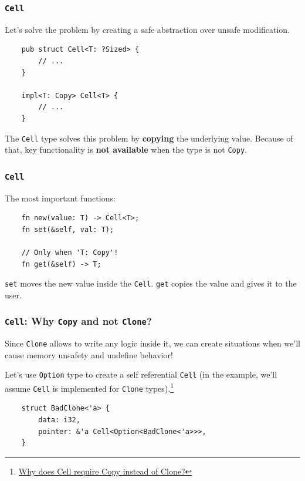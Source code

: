 \documentclass[aspectratio=1610,t]{beamer}
\begin{document}

\begin{frame}[fragile]
\frametitle{\texttt{Cell}}
Let's solve the problem by creating a safe abstraction over unsafe modification.

\begin{verbatim}
    pub struct Cell<T: ?Sized> {
        // ...
    }

    impl<T: Copy> Cell<T> {
        // ...
    }
\end{verbatim}

The \texttt{Cell} type solves this problem by \textbf{copying} the underlying value. Because of that, key functionality is \textbf{not available} when the type is not \texttt{Copy}.
\end{frame}


\begin{frame}[fragile]
\frametitle{\texttt{Cell}}
The most important functions:

\begin{verbatim}
    fn new(value: T) -> Cell<T>;
    fn set(&self, val: T);

    // Only when 'T: Copy'!
    fn get(&self) -> T;
\end{verbatim}

\texttt{set} moves the new value inside the \texttt{Cell}. \texttt{get} copies the value and gives it to the user.
\end{frame}


\begin{frame}[fragile]
\frametitle{\texttt{Cell}: Why \texttt{Copy} and not \texttt{Clone}?}
Since \texttt{Clone} allows to write any logic inside it, we can create situations when we'll cause memory unsafety and undefine behavior!

Let's use \texttt{Option} type to create a self referential \texttt{Cell} (in the example, we'll assume \texttt{Cell} is implemented for \texttt{Clone} types).\footnote{\href{https://users.rust-lang.org/t/why-does-cell-require-copy-instead-of-clone/5769/3}{Why does Cell require Copy instead of Clone?}}

\begin{verbatim}
    struct BadClone<'a> {
        data: i32,
        pointer: &'a Cell<Option<BadClone<'a>>>,
    }
\end{verbatim}
\end{frame}
\end{document}

